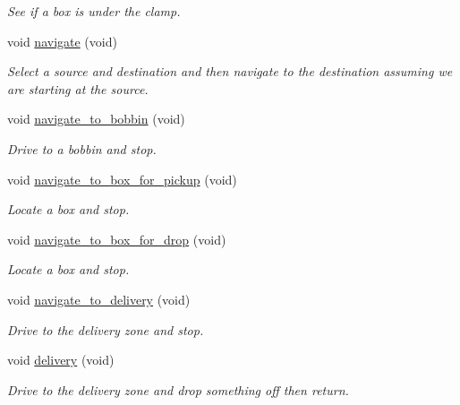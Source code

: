 \begin{DoxyCompactItemize}
\begin{DoxyCompactList}\small\item\em See if a box is under the clamp. \item\end{DoxyCompactList}\item 
void \hyperlink{classIDP_1_1SelfTests_a710347081427c05706f92bdd12f62fbe}{navigate} (void)
\begin{DoxyCompactList}\small\item\em Select a source and destination and then navigate to the destination assuming we are starting at the source. \item\end{DoxyCompactList}\item 
void \hyperlink{classIDP_1_1SelfTests_a74774d0867234315043af155d7d6ab2e}{navigate\_\-to\_\-bobbin} (void)
\begin{DoxyCompactList}\small\item\em Drive to a bobbin and stop. \item\end{DoxyCompactList}\item 
void \hyperlink{classIDP_1_1SelfTests_a0bc87b4b87714b787db2b9f0b185c7c0}{navigate\_\-to\_\-box\_\-for\_\-pickup} (void)
\begin{DoxyCompactList}\small\item\em Locate a box and stop. \item\end{DoxyCompactList}\item 
void \hyperlink{classIDP_1_1SelfTests_a6633d682d0126698d66392e1c750eeed}{navigate\_\-to\_\-box\_\-for\_\-drop} (void)
\begin{DoxyCompactList}\small\item\em Locate a box and stop. \item\end{DoxyCompactList}\item 
void \hyperlink{classIDP_1_1SelfTests_a7b656185650ea6c34563e3cb4795d47a}{navigate\_\-to\_\-delivery} (void)
\begin{DoxyCompactList}\small\item\em Drive to the delivery zone and stop. \item\end{DoxyCompactList}\item 
void \hyperlink{classIDP_1_1SelfTests_a1fa6c28ff5e8aa554d3e1bea81018204}{delivery} (void)
\begin{DoxyCompactList}\small\item\em Drive to the delivery zone and drop something off then return. \item\end{DoxyCompactList}\item 

\end{DoxyCompactItemize}
